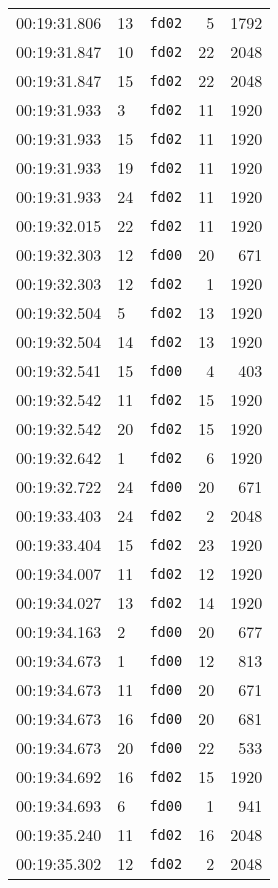 \documentclass{article}
\begin{document}
\begin{longtable}{lllrr}
00:19:31.806 & 13 & \texttt{fd02} & 5 & 1792 \\
00:19:31.847 & 10 & \texttt{fd02} & 22 & 2048 \\
00:19:31.847 & 15 & \texttt{fd02} & 22 & 2048 \\
00:19:31.933 & 3 & \texttt{fd02} & 11 & 1920 \\
00:19:31.933 & 15 & \texttt{fd02} & 11 & 1920 \\
00:19:31.933 & 19 & \texttt{fd02} & 11 & 1920 \\
00:19:31.933 & 24 & \texttt{fd02} & 11 & 1920 \\
00:19:32.015 & 22 & \texttt{fd02} & 11 & 1920 \\
00:19:32.303 & 12 & \texttt{fd00} & 20 & 671 \\
00:19:32.303 & 12 & \texttt{fd02} & 1 & 1920 \\
00:19:32.504 & 5 & \texttt{fd02} & 13 & 1920 \\
00:19:32.504 & 14 & \texttt{fd02} & 13 & 1920 \\
00:19:32.541 & 15 & \texttt{fd00} & 4 & 403 \\
00:19:32.542 & 11 & \texttt{fd02} & 15 & 1920 \\
00:19:32.542 & 20 & \texttt{fd02} & 15 & 1920 \\
00:19:32.642 & 1 & \texttt{fd02} & 6 & 1920 \\
00:19:32.722 & 24 & \texttt{fd00} & 20 & 671 \\
00:19:33.403 & 24 & \texttt{fd02} & 2 & 2048 \\
00:19:33.404 & 15 & \texttt{fd02} & 23 & 1920 \\
00:19:34.007 & 11 & \texttt{fd02} & 12 & 1920 \\
00:19:34.027 & 13 & \texttt{fd02} & 14 & 1920 \\
00:19:34.163 & 2 & \texttt{fd00} & 20 & 677 \\
00:19:34.673 & 1 & \texttt{fd00} & 12 & 813 \\
00:19:34.673 & 11 & \texttt{fd00} & 20 & 671 \\
00:19:34.673 & 16 & \texttt{fd00} & 20 & 681 \\
00:19:34.673 & 20 & \texttt{fd00} & 22 & 533 \\
00:19:34.692 & 16 & \texttt{fd02} & 15 & 1920 \\
00:19:34.693 & 6 & \texttt{fd00} & 1 & 941 \\
00:19:35.240 & 11 & \texttt{fd02} & 16 & 2048 \\
00:19:35.302 & 12 & \texttt{fd02} & 2 & 2048 \\

\end{longtable}
\end{document}
